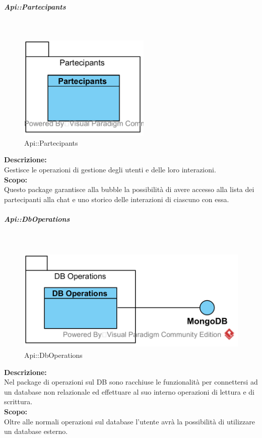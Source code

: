 \begin{samepage}
\subparagraph{Api\-::Partecipants}\label{api-partecipanti}\mbox{}\\
\nopagebreak
\begin{figure}[H]
	\centering
	\includegraphics[height=5cm]{diagrammi_img/classi_e_package/api_partecipanti.png}
	\caption{Api\-::Partecipants}
\end{figure}
\end{samepage}
\textbf{Descrizione:}\\ 
Gestisce le operazioni di gestione degli utenti e delle loro interazioni.\\
\textbf{Scopo:}\\
Questo package garantisce alla bubble la possibilità di avere accesso alla lista dei partecipanti alla chat e uno storico delle interazioni di ciascuno con essa.

\begin{samepage}
\subparagraph{Api\-::DbOperations}\label{api-db}\mbox{}\\
\nopagebreak
\begin{figure}[H]
	\centering
	\includegraphics[height=5cm]{diagrammi_img/classi_e_package/api_operazionidb.png}
	\caption{Api\-::DbOperations}
\end{figure}
\end{samepage}
\textbf{Descrizione:}\\
Nel package di operazioni sul DB sono racchiuse le funzionalità per connettersi ad un database non relazionale ed effettuare al suo interno operazioni di lettura e di scrittura.\\
\textbf{Scopo:}\\
Oltre alle normali operazioni sul database l'utente avrà la possibilità di utilizzare un database esterno.

